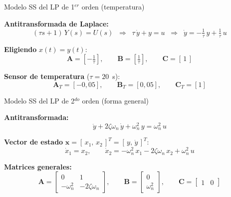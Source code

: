 \documentclass[aspectratio=169,t]{beamer}
\begin{document}
\begin{frame}{Modelo SS del LP de 1$^{er}$ orden (temperatura)}
\vspace{3mm}

\textbf{Antitransformada de Laplace:}
\begin{equation*}
(\tau s + 1)\,Y(s) = U(s)
\;\;\Longrightarrow\;\;
\tau\,\dot y + y = u
\;\;\Longrightarrow\;\;
\dot y = -\tfrac{1}{\tau}\,y + \tfrac{1}{\tau}\,u
\end{equation*}

\textbf{Eligiendo} $x(t) = y(t)$:
\begin{equation*}
\bm{A} = \left[-\tfrac{1}{\tau}\right],
\qquad
\bm{B} = \left[\tfrac{1}{\tau}\right],
\qquad
\bm{C} = [\,1\,]
\end{equation*}

\textbf{Sensor de temperatura} ($\tau = 20$~s):
\begin{equation*}
\bm{A}_T = [-0{,}05],
\qquad
\bm{B}_T = [0{,}05],
\qquad
\bm{C}_T = [1]
\end{equation*}
\end{frame}

\begin{frame}{Modelo SS del LP de 2$^{do}$ orden (forma general)}
\vspace{2mm}

\textbf{Antitransformada:}
\begin{equation*}
\ddot y + 2\zeta\omega_n\,\dot y + \omega_n^{2}\,y = \omega_n^{2}\,u
\end{equation*}

\textbf{Vector de estado} $\bm{x} = [\,x_1,\,x_2\,]^T = [\,y,\,\dot y\,]^T$:
\begin{equation*}
\dot x_1 = x_2,
\qquad
\dot x_2 = -\omega_n^{2}\,x_1 - 2\zeta\omega_n\,x_2 + \omega_n^{2}\,u
\end{equation*}

\textbf{Matrices generales:}
\begin{equation*}
\bm{A} = \begin{bmatrix} 0 & 1 \\ -\omega_n^{2} & -2\zeta\omega_n \end{bmatrix},
\qquad
\bm{B} = \begin{bmatrix} 0 \\ \omega_n^{2} \end{bmatrix},
\qquad
\bm{C} = \begin{bmatrix} 1 & 0 \end{bmatrix}
\end{equation*}
\end{frame}
\end{document}
